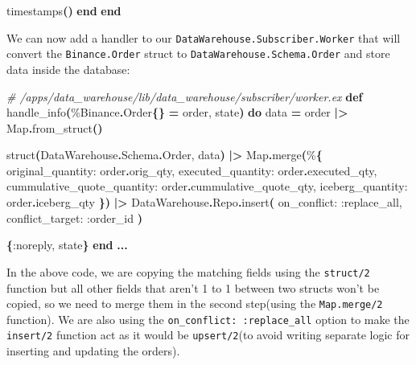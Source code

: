 \documentclass[
  oneside]{book}
\newenvironment{Shaded}{\begin{snugshade}}{\end{snugshade}}
\newcommand{\CommentTok}[1]{\textcolor[rgb]{0.56,0.35,0.01}{\textit{#1}}}
\newcommand{\ConstantTok}[1]{\textcolor[rgb]{0.56,0.35,0.01}{#1}}
\newcommand{\FunctionTok}[1]{\textcolor[rgb]{0.13,0.29,0.53}{\textbf{#1}}}
\newcommand{\KeywordTok}[1]{\textcolor[rgb]{0.13,0.29,0.53}{\textbf{#1}}}
\newcommand{\NormalTok}[1]{#1}
\newcommand{\OperatorTok}[1]{\textcolor[rgb]{0.81,0.36,0.00}{\textbf{#1}}}
\newcommand{\VariableTok}[1]{\textcolor[rgb]{0.00,0.00,0.00}{#1}}
\begin{document}
\begin{Shaded}
\begin{Highlighting}[]
\NormalTok{    timestamps}\FunctionTok{()}
  \KeywordTok{end}
\KeywordTok{end}
\end{Highlighting}
\end{Shaded}

\newpage

We can now add a handler to our \texttt{DataWarehouse.Subscriber.Worker} that will convert the \texttt{Binance.Order} struct to \texttt{DataWarehouse.Schema.Order} and store data inside the database:

\begin{Shaded}
\begin{Highlighting}[]
\CommentTok{\# /apps/data\_warehouse/lib/data\_warehouse/subscriber/worker.ex}
  \KeywordTok{def}\NormalTok{ handle\_info}\FunctionTok{(}\NormalTok{\%}\ConstantTok{Binance}\OperatorTok{.}\ConstantTok{Order}\FunctionTok{\{\}} \OperatorTok{=}\NormalTok{ order, state}\FunctionTok{)} \KeywordTok{do}
\NormalTok{    data }\OperatorTok{=}
\NormalTok{      order}
      \OperatorTok{|\textgreater{}} \ConstantTok{Map}\OperatorTok{.}\NormalTok{from\_struct}\FunctionTok{()}

\NormalTok{    struct}\FunctionTok{(}\ConstantTok{DataWarehouse}\OperatorTok{.}\ConstantTok{Schema}\OperatorTok{.}\ConstantTok{Order}\NormalTok{, data}\FunctionTok{)}
    \OperatorTok{|\textgreater{}} \ConstantTok{Map}\OperatorTok{.}\NormalTok{merge}\FunctionTok{(}\NormalTok{\%}\FunctionTok{\{}
      \VariableTok{original\_quantity:}\NormalTok{ order}\OperatorTok{.}\NormalTok{orig\_qty,}
      \VariableTok{executed\_quantity:}\NormalTok{ order}\OperatorTok{.}\NormalTok{executed\_qty,}
      \VariableTok{cummulative\_quote\_quantity:}\NormalTok{ order}\OperatorTok{.}\NormalTok{cummulative\_quote\_qty,}
      \VariableTok{iceberg\_quantity:}\NormalTok{ order}\OperatorTok{.}\NormalTok{iceberg\_qty}
    \FunctionTok{\})}
    \OperatorTok{|\textgreater{}} \ConstantTok{DataWarehouse}\OperatorTok{.}\ConstantTok{Repo}\OperatorTok{.}\NormalTok{insert}\FunctionTok{(}
      \VariableTok{on\_conflict:} \VariableTok{:replace\_all}\NormalTok{,}
      \VariableTok{conflict\_target:} \VariableTok{:order\_id}
    \FunctionTok{)}

    \FunctionTok{\{}\VariableTok{:noreply}\NormalTok{, state}\FunctionTok{\}}
  \KeywordTok{end}
  \OperatorTok{...}
\end{Highlighting}
\end{Shaded}

In the above code, we are copying the matching fields using the \texttt{struct/2} function but all other fields that aren't 1 to 1 between two structs won't be copied, so we need to merge them in the second step(using the \texttt{Map.merge/2} function). We are also using the \texttt{on\_conflict:\ :replace\_all} option to make the \texttt{insert/2} function act as it would be \texttt{upsert/2}(to avoid writing separate logic for inserting and updating the orders).
\end{document}
